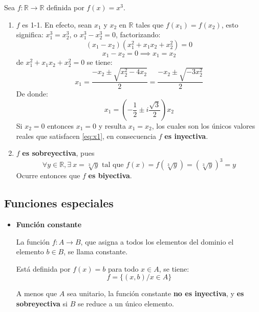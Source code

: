 \begin{fmd-example}
	Sea $f: \mathbb{R} \rightarrow \mathbb{R}$ definida por $f(x) = x^3$.
	\begin{enumerate}
		\item $f$ es 1-1. En efecto, sean $x_1$ y $x_2$ en $\mathbb{R}$ tales que
		$f(x_1) = f(x_2)$, esto significa: $x_1^3 = x_2^3$, o $x_1^3 - x_2^3 = 0$,
		factorizando: \[(x_1 - x_2)(x_1^2 + x_1x_2 + x_2^2) = 0\]
		\[ x_1 - x_2 = 0 \implies x_1 = x_2 \]
		de $x_1^2 + x_1x_2 + x_2^2=0$ se tiene:
		\[ x_1 = \frac{-x_2 \pm \sqrt{x_2^2 - 4 x_2} }{2} =
		\frac{-x_2 \pm \sqrt{-3x_2^2}}{2} \]
		De donde:
		\begin{equation} \label{eq:x1}
			x_1 = \left( -\frac{1}{2} \pm i \frac{\sqrt{3}}{2} \right) x_2
		\end{equation}
		Si $x_2=0$ entonces $x_1 = 0$ y resulta $x_1 = x_2$, los cuales son los únicos
		valores reales que satisfacen \eqref{eq:x1}, en consecuencia $f$ \textbf{es inyectiva}.
		
		\item $f$ \textbf{es sobreyectiva}, pues
		\[ \forall y \in \mathbb{R}, \exists \ x = \sqrt[3]{y} \mbox{ tal que }
		f(x) = f(\sqrt[3]{y}) = \left( \sqrt[3]{y} \right)^3 = y\]
		Ocurre entonces que $f$ \textbf{es biyectiva}.
	\end{enumerate}
\end{fmd-example}

\subsection{Funciones especiales} \label{sec:especiales}
\begin{itemize}
	\item \textbf{Función constante} 
	
	La función $f: A \rightarrow B$, que asigna a todos los elementos del dominio el
	elemento $b \in B$, se llama constante.
	
	Está definida por $f(x) = b$ para todo $x \in A$, se tiene:
	\[ f = \{ (x, b) / x \in A \} \]
	
	A menos que $A$ sea unitario, la función constante \textbf{no es inyectiva}, y
	\textbf{es sobreyectiva} si $B$ se reduce a un único elemento.
\end{itemize}
\begin{figure}[H]
	\centering
\end{figure}


